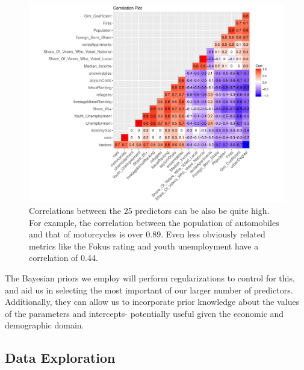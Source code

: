 \documentclass[10pt,a4paper, hidelinks]{article} %
\begin{document}
\begin{figure}[H]
	\centering
	\begin{minipage}[c]{0.7\textwidth}
	\includegraphics[width=1\linewidth]{../fig/corr_plot}
	\end{minipage} \hfill
	\begin{minipage}[c]{0.29\textwidth}
	\caption{Correlations between the 25 predictors can be also be quite high.  For example, the correlation between the population of automobiles and that of motorcycles is over 0.89.  Even less obviously related metrics like the Fokus rating and youth unemployment have a correlation of 0.44.}
	\end{minipage}
	\label{fig:firespermuni}
\end{figure}

The Bayesian priors we employ will perform regularizations to control for this, and aid us in selecting the most important of our larger number of predictors.  Additionally, they can allow us to incorporate prior knowledge about the values of the parameters and intercepts- potentially useful given the economic and demographic domain.

\subsection{Data Exploration}
\end{document}
